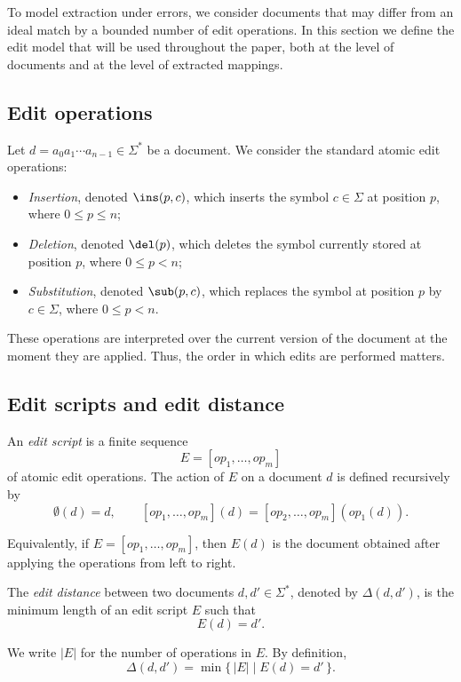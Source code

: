 
To model extraction under errors, we consider documents that may differ from an ideal match by a bounded number of edit operations. In this section we define the edit model that will be used throughout the paper, both at the level of documents and at the level of extracted mappings.


\subsection{Edit operations}

Let $d = a_0 a_1 \cdots a_{n-1} \in \Sigma^*$ be a document. We consider the standard atomic edit operations:
\begin{itemize}
	\item \emph{Insertion}, denoted $\ins(p,c)$, which inserts the symbol $c \in \Sigma$ at position $p$, where $0 \le p \le n$;
	\item \emph{Deletion}, denoted $\del(p)$, which deletes the symbol currently stored at position $p$, where $0 \le p < n$;
	\item \emph{Substitution}, denoted $\sub(p,c)$, which replaces the symbol at position $p$ by $c \in \Sigma$, where $0 \le p < n$.
\end{itemize}

These operations are interpreted over the current version of the document at the moment they are applied. Thus, the order in which edits are performed matters.

\subsection{Edit scripts and edit distance}

An \emph{edit script} is a finite sequence
\[
E = [op_1,\dots,op_m]
\]
of atomic edit operations. The action of $E$ on a document $d$ is defined recursively by
\[
\emptyset(d) = d,
\qquad
[op_1,\dots,op_m](d) = [op_2,\dots,op_m](op_1(d)).
\]

Equivalently, if $E = [op_1,\dots,op_m]$, then $E(d)$ is the document obtained after applying the operations from left to right.

The \emph{edit distance} between two documents $d,d' \in \Sigma^*$, denoted by $\Delta(d,d')$, is the minimum length of an edit script $E$ such that
\[
E(d)=d'.
\]

We write $|E|$ for the number of operations in $E$. By definition,
\[
\Delta(d,d') = \min \{\, |E| \mid E(d)=d' \,\}.
\]

